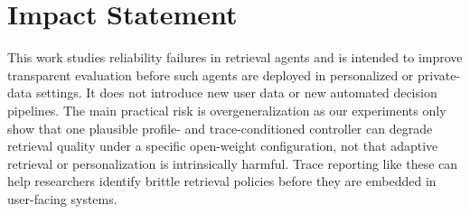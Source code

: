 \documentclass{article}
\theoremstyle{plain}
\theoremstyle{definition}
\theoremstyle{remark}
\begin{document}
\makeatletter
\renewcommand{\ICML@appearing}{\textit{Accepted at the Failure Modes in Agentic AI (FAGEN) Workshop at ICML 2026}, Seoul, South Korea. Copyright 2026 by the author(s).}
\makeatother


\printAffiliationsAndNotice{}










\section*{Impact Statement}
This work studies reliability failures in retrieval agents and is intended to improve transparent evaluation before such agents are deployed in personalized or private-data settings. It does not introduce new user data or new automated decision pipelines. The main practical risk is overgeneralization as our experiments only show that one plausible profile- and trace-conditioned controller can degrade retrieval quality under a specific open-weight configuration, not that adaptive retrieval or personalization is intrinsically harmful. Trace reporting like these can help researchers identify brittle retrieval policies before they are embedded in user-facing systems.





\end{document}
